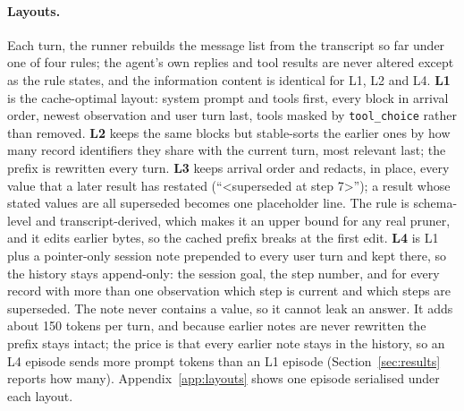 \paragraph{Layouts.} Each turn, the runner rebuilds the message list from the transcript so far under one of four rules; the agent's own replies and tool results are never altered except as the rule states, and the information content is identical for L1, L2 and L4. \textbf{L1} is the cache-optimal layout: system prompt and tools first, every block in arrival order, newest observation and user turn last, tools masked by \texttt{tool\_choice} rather than removed. \textbf{L2} keeps the same blocks but stable-sorts the earlier ones by how many record identifiers they share with the current turn, most relevant last; the prefix is rewritten every turn. \textbf{L3} keeps arrival order and redacts, in place, every value that a later result has restated (``\textless superseded at step 7\textgreater''); a result whose stated values are all superseded becomes one placeholder line. The rule is schema-level and transcript-derived, which makes it an upper bound for any real pruner, and it edits earlier bytes, so the cached prefix breaks at the first edit. \textbf{L4} is L1 plus a pointer-only session note prepended to every user turn and kept there, so the history stays append-only: the session goal, the step number, and for every record with more than one observation which step is current and which steps are superseded. The note never contains a value, so it cannot leak an answer. It adds about 150 tokens per turn, and because earlier notes are never rewritten the prefix stays intact; the price is that every earlier note stays in the history, so an L4 episode sends more prompt tokens than an L1 episode (Section~\ref{sec:results} reports how many). Appendix~\ref{app:layouts} shows one episode serialised under each layout.

